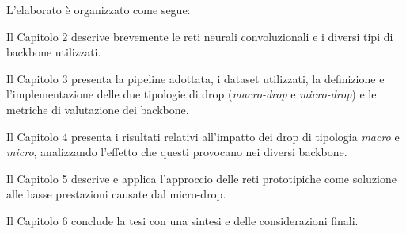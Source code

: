 L’elaborato è organizzato come segue:

Il Capitolo 2 descrive brevemente le reti neurali convoluzionali e i diversi tipi di backbone utilizzati.
 
Il Capitolo 3 presenta la pipeline adottata, i dataset utilizzati, la definizione e l'implementazione delle due tipologie di drop (\textit{macro-drop} e \textit{micro-drop}) e le metriche di valutazione dei backbone. 

Il Capitolo 4 presenta i risultati relativi all'impatto dei drop di tipologia \textit{macro} e \textit{micro}, analizzando l'effetto che questi provocano nei diversi backbone.

Il Capitolo 5 descrive e applica l'approccio delle reti prototipiche come soluzione alle basse prestazioni causate dal micro-drop.

Il Capitolo 6 conclude la tesi con una sintesi e delle considerazioni finali.
